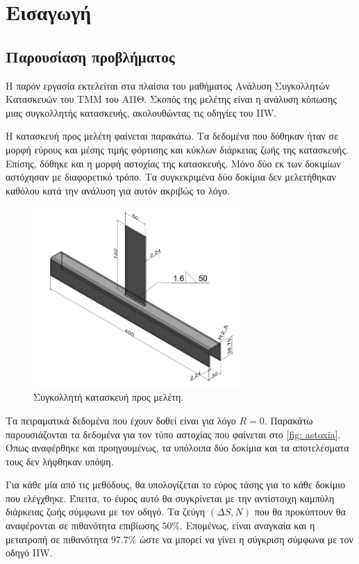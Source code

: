 \documentclass{article}
\begin{document}



\tableofcontents

\section{Εισαγωγή}
\subsection{Παρουσίαση προβλήματος}
Η παρόν εργασία εκτελείται στα πλαίσια του μαθήματος Ανάλυση Συγκολλητών Κατασκευών του ΤΜΜ του ΑΠΘ. Σκοπός της μελέτης είναι η ανάλυση κόπωσης μιας συγκολλητής κατασκευής, ακολουθώντας τις οδηγίες του IIW. 
\par Η κατασκευή προς μελέτη φαίνεται παρακάτω. Τα δεδομένα που δόθηκαν ήταν σε μορφή εύρους και μέσης τιμής φόρτισης και κύκλων διάρκειας ζωής της κατασκευής. Επίσης, δόθηκε και η μορφή αστοχίας της κατασκευής. Μόνο δύο εκ των δοκιμίων αστόχησαν με διαφορετικό τρόπο. Τα συγκεκριμένα δύο δοκίμια δεν μελετήθηκαν καθόλου κατά την ανάλυση για αυτόν ακριβώς το λόγο.
\begin{figure}[H]
    \centering
    \includegraphics[width = 0.7\textwidth]{media/ditr.png}
    \caption{Συγκολλητή κατασκευή προς μελέτη.}
    \label{fig: ditr}
\end{figure}

Τα πειραματικά δεδομένα που έχουν δοθεί είναι για λόγο $R = 0$. Παρακάτω παρουσιάζονται τα δεδομένα για τον τύπο αστοχίας που φαίνεται στο \ref{fig: astoxia}. Όπως αναφέρθηκε και προηγουμένως, τα υπόλοιπα δύο δοκίμια και τα αποτελέσματα τους δεν λήφθηκαν υπόψη.
\par Για κάθε μία από τις μεθόδους, θα υπολογίζεται το εύρος τάσης για το κάθε δοκίμιο που ελέγχθηκε. Έπειτα, το έυρος αυτό θα συγκρίνεται με την αντίστοιχη καμπύλη διάρκειας ζωής σύμφωνα με τον οδηγό. Τα ζεύγη $(\Delta S, N)$ που θα προκύπτουν θα αναφέρονται σε πιθανότητα επιβίωσης $50\%$. Επομένως, είναι αναγκαία και η μετατροπή σε πιθανότητα $97.7\%$ ώστε να μπορεί να γίνει η σύγκριση σύμφωνα με τον οδηγό IIW.
\end{document}
